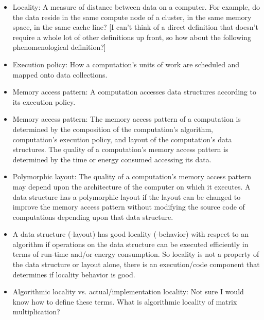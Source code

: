 \begin{itemize}
\begin{itemize}
  \item {} Locality: A measure of distance between data on a computer.  For example, do the data reside in the same compute node of a cluster, in the same memory space, in the same cache line?  [I can't think of a direct definition that doesn't require a whole lot of other definitions up front, so how about the following phenomenological definition?]

  \item Execution policy: How a computation's units of work are scheduled and mapped onto data collections. 

  \item Memory access pattern: A computation accesses data structures according to its execution policy. 

  \item Memory access pattern: The memory access pattern of a computation is determined by the composition of the computation's algorithm, computation's execution policy, and layout of the computation's data structures.  The quality of a computation's memory access pattern is determined by the time or energy consumed accessing its data.  

  \item Polymorphic layout: The quality of a computation's memory access pattern may depend upon the architecture of the computer on which it executes.  A data structure has a polymorphic layout if the layout can be changed to improve the memory access pattern without modifying the source code of computations depending upon that data structure.

  \item A data structure (-layout) has good locality (-behavior) with respect to an algorithm if operations on the data structure can be executed efficiently in terms of run-time and/or energy consumption. So locality is not a property of the data structure or layout alone, there is an execution/code component that determines if locality behavior is good.

  \item Algorithmic locality vs. actual/implementation locality: Not sure I would know how to define these terms. What is algorithmic locality of matrix multiplication? 


\end{itemize}
\end{itemize}
